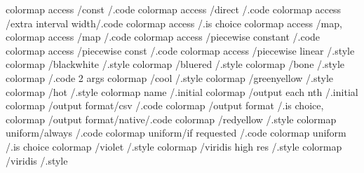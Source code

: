 colormap access /const               /.code      
colormap access /direct              /.code      
colormap access /extra interval width/.code      
colormap access                      /.is choice
colormap access /map,                
colormap access /map                 /.code      
colormap access /piecewise constant  /.code      
colormap access /piecewise const     /.code      
colormap access /piecewise linear    /.style     
colormap        /blackwhite          /.style     
colormap        /bluered             /.style     
colormap        /bone                /.style     
colormap                             /.code 2 args        
colormap        /cool                /.style     
colormap        /greenyellow         /.style     
colormap        /hot                 /.style     
colormap name                        /.initial   
colormap        /output each nth     /.initial   
colormap        /output format/csv   /.code
colormap        /output format       /.is choice,
colormap        /output format/native/.code
colormap        /redyellow           /.style     
colormap uniform/always              /.code      
colormap uniform/if requested        /.code      
colormap uniform                     /.is choice
colormap        /violet              /.style     
colormap        /viridis high res    /.style     
colormap        /viridis             /.style     

